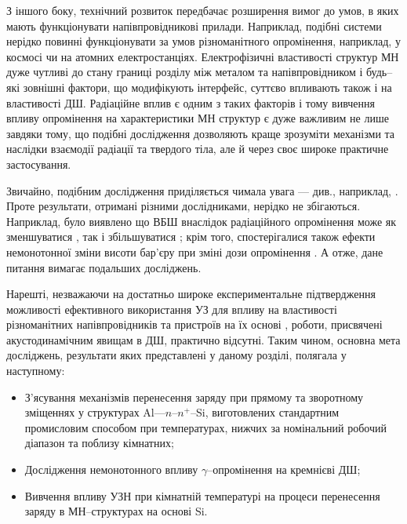 З іншого боку, технічний розвиток передбачає розширення вимог до умов, в яких мають функціонувати напівпровідникові прилади.
Наприклад, подібні системи нерідко повинні функціонувати за умов різноманітного опромінення, наприклад, у космосі чи на атомних електростанціях.
Електрофізичні властивості структур МН дуже чутливі до стану границі розділу між металом та напівпровідником і будь--які
зовнішні фактори, що модифікують інтерфейс, суттєво впливають також і на властивості ДШ.
Радіаційне вплив є одним з таких факторів і тому вивчення впливу опромінення на характеристики МН структур є дуже важливим не лише завдяки
тому, що подібні дослідження дозволяють краще зрозуміти механізми та наслідки взаємодії радіації та твердого тіла,
але й через своє широке практичне застосування.



Звичайно, подібним дослідження приділяється чимала увага  --- див., наприклад,
\cite{Kumar1, Rao, Kumar2, Sharma, Ohyama, Tataroglu,Tascioglu2010old,Tataroglu:2007NIMA,Tataroglu3,Karatas:2006NIMA,Umana,Kinoshita,Vorobets,Pattabi,Kovalyuk,Verma,Abdolahpour}.
Проте результати, отримані різними дослідниками, нерідко не збігаються.
Наприклад, було виявлено що ВБШ внаслідок радіаційного опромінення може як зменшуватися \cite{Kumar1, Rao, Kumar2, Sharma, Ohyama,Tataroglu3},
так і збільшуватися \cite{Tataroglu,Tascioglu2010old,Tataroglu:2007NIMA};
крім того, спостерігалися також ефекти немонотонної зміни висоти бар'єру при зміні дози опромінення \cite{Karatas:2006NIMA,Umana,Kinoshita,Vorobets, Pattabi, Kovalyuk,Verma}.
А отже, дане питання вимагає подальших досліджень.

Нарешті, незважаючи на достатньо широке експериментальне підтвердження можливості ефективного використання УЗ для впливу на властивості різноманітних напівпровідників та
пристроїв на їх основі
\cite{Bahar2003,ZobovFTP2008,Parchinskii2006r,Roman:2007APL,Roman:2010JAP,Zaver2005,Davletova2008,Teterkin2009r,Tagaev,Pashaev2012r,YOlikhTPL2011r,Zaveryukhin2002:2},
роботи, присвячені акустодинамічним явищам в ДШ, практично відсутні.
Таким чином, основна мета досліджень, результати яких представлені у даному розділі, полягала у наступному:
\begin{itemize}[leftmargin=0cm,itemindent=1em]
  \item З'ясування механізмів перенесення заряду  при прямому та
    зворотному зміщеннях у структурах Al---$n$--$n^+$--Si, виготовлених стандартним промисловим способом при температурах, нижчих за номінальний робочий діапазон та поблизу кімнатних;
  \item Дослідження немонотонного впливу $\gamma$--опромінення на кремнієві ДШ;
  \item Вивчення впливу УЗН при кімнатній температурі на процеси перенесення заряду в МН--структурах на основі Si.
\end{itemize}



